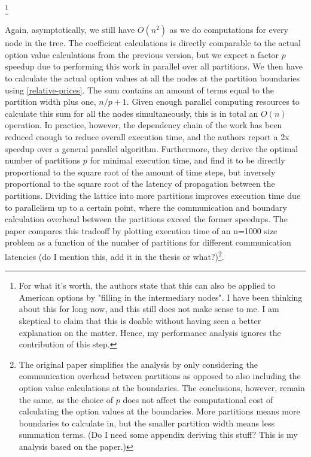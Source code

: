 \documentclass[english,12pt,a4paper,pdftex,sci,utf8]{aaltothesis}
\begin{document}
\footnote{For what it's worth, the authors state that this can also be applied to American options by "filling in the intermediary nodes". I have been thinking about this for long now, and this still does not make sense to me. I am skeptical to claim that this is doable without having seen a better explanation on the matter. Hence, my performance analysis ignores the contribution of this step.}

Again, asymptotically, we still have $O(n^2)$ as we do computations for every node in the tree. The coefficient calculations is directly comparable to the actual option value calculations from the previous version, but we expect a factor $p$ speedup due to performing this work in parallel over all partitions. We then have to calculate the actual option values at all the nodes at the partition boundaries using \eqref{relative-prices}. The sum contains an amount of terms equal to the partition width plus one, $n/p+1$. Given enough parallel computing resources to calculate this sum for all the nodes simultaneously, this is in total an $O(n)$ operation. In practice, however, the dependency chain of the work has been reduced enough to reduce overall execution time, and the authors report a 2x speedup over a general parallel algorithm. Furthermore, they derive the optimal number of partitions $p$ for minimal execution time, and find it to be directly proportional to the square root of the amount of time steps, but inversely proportional to the square root of the latency of propagation between the partitions. Dividing the lattice into more partitions improves execution time due to parallelism up to a certain point, where the communication and boundary calculation overhead between the partitions exceed the former speedups. The paper compares this tradeoff by plotting execution time of an n=1000 size problem as a function of the number of partitions for different communication latencies (do I mention this, add it in the thesis or what?)\footnote{The original paper simplifies the analysis by only considering the communication overhead between partitions as opposed to also including the option value calculations at the boundaries. The conclusions, however, remain the same, as the choice of $p$ does not affect the computational cost of calculating the option values at the boundaries. More partitions means more boundaries to calculate in, but the smaller partition width means less summation terms. (Do I need some appendix deriving this stuff? This is my analysis based on the paper.)}.
\end{document}
